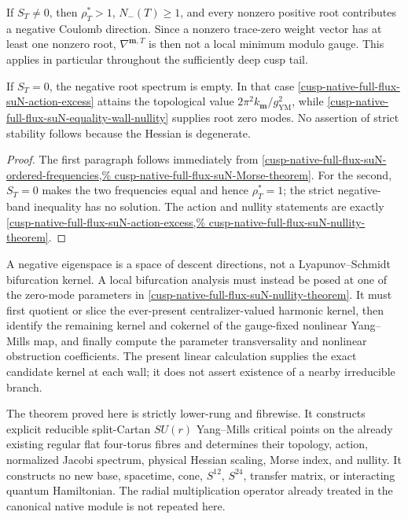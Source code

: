 \begin{proposition}
\label{cusp-native-full-flux-suN-stability-boundary}
If \(S_T\ne0\), then \(\rho_T^*>1\), \(N_-(T)\ge1\), and every nonzero
positive root contributes a negative Coulomb direction.  Since a nonzero
trace-zero weight vector has at least one nonzero root,
\(\nabla^{\mathbf m,T}\) is then not a local minimum modulo gauge.  This
applies in particular throughout the sufficiently deep cusp tail.

If \(S_T=0\), the negative root spectrum is empty.  In that case
\cref{cusp-native-full-flux-suN-action-excess} attains the topological value
\(2\pi^2k_{\mathbf m}/g_{\mathrm{YM}}^2\), while
\cref{cusp-native-full-flux-suN-equality-wall-nullity} supplies root zero
modes.  No assertion of strict stability follows because the Hessian is
degenerate.
\end{proposition}

\begin{proof}
The first paragraph follows immediately from
\cref{cusp-native-full-flux-suN-ordered-frequencies,%
cusp-native-full-flux-suN-Morse-theorem}.  For the second,
\(S_T=0\) makes the two frequencies equal and hence \(\rho_T^*=1\); the
strict negative-band inequality has no solution.  The action and nullity
statements are exactly
\cref{cusp-native-full-flux-suN-action-excess,%
cusp-native-full-flux-suN-nullity-theorem}.
\end{proof}

A negative eigenspace is a space of descent directions, not a
Lyapunov--Schmidt bifurcation kernel.  A local bifurcation analysis must
instead be posed at one of the zero-mode parameters in
\cref{cusp-native-full-flux-suN-nullity-theorem}.  It must first quotient or
slice the ever-present centralizer-valued harmonic kernel, then identify the
remaining kernel and cokernel of the gauge-fixed nonlinear Yang--Mills map,
and finally compute the parameter transversality and nonlinear obstruction
coefficients.  The present linear calculation supplies the exact candidate
kernel at each wall; it does not assert existence of a nearby irreducible
branch.

The theorem proved here is strictly lower-rung and fibrewise.  It constructs
explicit reducible split-Cartan \(SU(r)\) Yang--Mills critical points on the
already existing regular flat four-torus fibres and determines their
topology, action, normalized Jacobi spectrum, physical Hessian scaling,
Morse index, and nullity.  It constructs no new base, spacetime, cone,
\(S^{12}\), \(S^{24}\), transfer matrix, or interacting quantum Hamiltonian.
The radial multiplication operator already treated in the canonical native
module is not repeated here.


